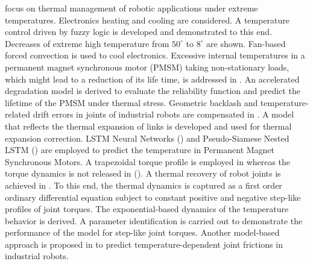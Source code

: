 \documentclass{ifacconf}
\begin{document}
\cite{afaq2023intelligent} focus on thermal management of robotic applications under extreme temperatures. Electronics heating and cooling are considered. A temperature control driven by fuzzy logic is developed and demonstrated to this end. Decreases of extreme high temperature from $50^{\circ}$ to $8^{\circ}$ are shown. Fan-based forced convection is used to cool electronics. Excessive internal temperatures in a permanent magnet synchronous motor (PMSM) taking non-stationary loads, which might lead to a reduction of its life time, is addressed in \cite{chen2024lifetime}. An accelerated degradation model is derived to evaluate the reliability function and predict the lifetime of the PMSM under thermal stress.  Geometric backlash and temperature-related drift errors in joints of industrial robots are compensated in \cite{sigron2023compensation}. A model that reflects the thermal expansion of links is developed and used for thermal expansion correction.  LSTM Neural
Networks (\cite{he2024rotor})  and   Pseudo-Siamese Nested LSTM (\cite{cai2021temperature}) are employed to predict the temperature in Permanent Magnet Synchronous Motors. A trapezoidal torque profile is employed in \cite{he2024rotor} whereas the torque dynamics is not released in (\cite{cai2021temperature}). A thermal recovery of robot joints is achieved in  \cite{jorgensen2019thermal}. To this end, the thermal dynamics is captured as a first order ordinary differential equation subject to constant positive and negative step-like profiles of joint torques. The exponential-based dynamics of the temperature behavior is derived.  A parameter identification is carried out to demonstrate the performance of the model for step-like joint torques. Another model-based approach is proposed in \cite{trinh2023modeling} to predict temperature-dependent joint frictions in industrial robots.
\end{document}
